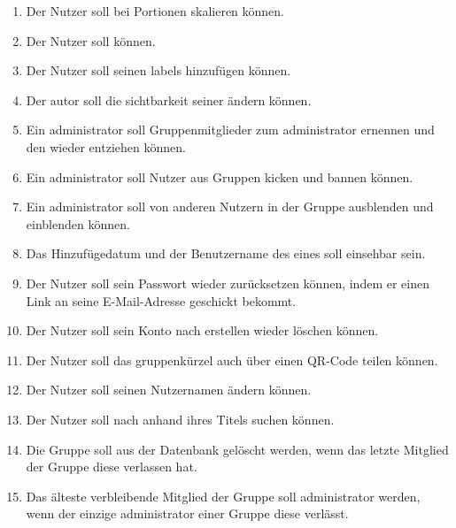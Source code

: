 \documentclass[parskip=full]{scrartcl}
\begin{document}
\begin{enumerate}[start=1,label={$\langle$\bfseries RS\arabic*$\rangle$}, leftmargin = 5em, itemsep=4pt, parsep=4pt]
    \item Der Nutzer soll bei  Portionen skalieren können.\label{rs:PortionScaling}
    \item Der Nutzer soll   können.\label{rs:RecipeFavourites}
    \item Der Nutzer soll seinen  \Gls{labels} hinzufügen können.\label{rs:RecipeLabels}
    \item Der \gls{autor} soll die \Gls{sichtbarkeit} seiner  ändern können.\label{rs:RecipeVisibility}
    \item Ein \Gls{administrator} soll Gruppenmitglieder zum \Gls{administrator} ernennen und den  wieder entziehen können.\label{rs:AdminCreation}
    \item Ein \Gls{administrator} soll Nutzer aus Gruppen \gls{kicken} und \gls{bannen} können.\label{rs:Kicking}
    \item Ein \Gls{administrator} soll  von anderen Nutzern in der Gruppe \gls{ausblenden} und \gls{einblenden} können.\label{rs:RecipeHiding}
    \item Das Hinzufügedatum und der Benutzername des  eines  soll einsehbar sein.\label{rs:AuthorAndDate}
    \item Der Nutzer soll sein Passwort wieder zurücksetzen können, indem er einen Link an seine E-Mail-Adresse geschickt bekommt.\label{rs:ResetPassword}
    \item Der Nutzer soll sein Konto nach erstellen wieder löschen können.\label{rs:AccountDeletion}
    \item Der Nutzer soll das \gls{gruppenkürzel} auch über einen QR-Code teilen können.\label{rs:QRCode}
    \item Der Nutzer soll seinen Nutzernamen ändern können.\label{rs:ChangeUsername}
    \item Der Nutzer soll nach  anhand ihres Titels suchen können.\label{rs:Searching}
    \item Die Gruppe soll aus der Datenbank gelöscht werden, wenn das letzte Mitglied der Gruppe diese verlassen hat.\label{rs:EmptyGroup}
    \item Das älteste verbleibende Mitglied der Gruppe soll \Gls{administrator} werden, wenn der einzige \Gls{administrator} einer Gruppe diese verlässt.\label{rs:NoAdmins}

\end{enumerate}
\end{document}
